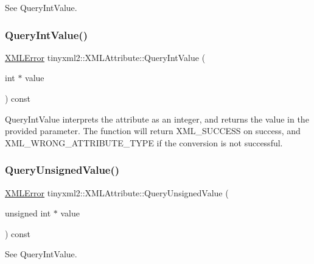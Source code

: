 See Query\+Int\+Value. 

\mbox{\label{classtinyxml2_1_1_x_m_l_attribute_a6d5176260db00ea301c01af8457cd993}} 
\subsubsection{\texorpdfstring{Query\+Int\+Value()}{QueryIntValue()}}
{\footnotesize\ttfamily \mbox{\hyperlink{namespacetinyxml2_a1fbf88509c3ac88c09117b1947414e08}{X\+M\+L\+Error}} tinyxml2\+::\+X\+M\+L\+Attribute\+::\+Query\+Int\+Value (\begin{DoxyParamCaption}\item[{int $\ast$}]{value }\end{DoxyParamCaption}) const}

Query\+Int\+Value interprets the attribute as an integer, and returns the value in the provided parameter. The function will return X\+M\+L\+\_\+\+S\+U\+C\+C\+E\+SS on success, and X\+M\+L\+\_\+\+W\+R\+O\+N\+G\+\_\+\+A\+T\+T\+R\+I\+B\+U\+T\+E\+\_\+\+T\+Y\+PE if the conversion is not successful. \mbox{\label{classtinyxml2_1_1_x_m_l_attribute_a48a7f3496f1415832e451bd8d09c9cb9}} 
\subsubsection{\texorpdfstring{Query\+Unsigned\+Value()}{QueryUnsignedValue()}}
{\footnotesize\ttfamily \mbox{\hyperlink{namespacetinyxml2_a1fbf88509c3ac88c09117b1947414e08}{X\+M\+L\+Error}} tinyxml2\+::\+X\+M\+L\+Attribute\+::\+Query\+Unsigned\+Value (\begin{DoxyParamCaption}\item[{unsigned int $\ast$}]{value }\end{DoxyParamCaption}) const}



See Query\+Int\+Value. 

\mbox{\label{classtinyxml2_1_1_x_m_l_attribute_a406d2c4a13c7af99a65edb59dd9f7581}} 
